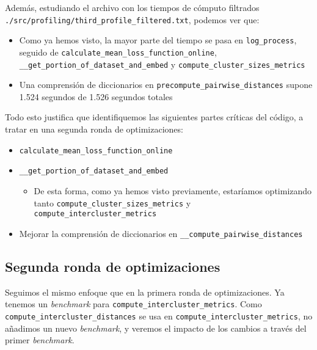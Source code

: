 Además, estudiando el archivo con los tiempos de cómputo filtrados \lstinline{./src/profiling/third_profile_filtered.txt}, podemos ver que:

\begin{itemize}
    \item Como ya hemos visto, la mayor parte del tiempo se pasa en \lstinline{log_process}, seguido de \lstinline{calculate_mean_loss_function_online}, \lstinline{__get_portion_of_dataset_and_embed} y \lstinline{compute_cluster_sizes_metrics}
    \item Una comprensión de diccionarios en \lstinline{precompute_pairwise_distances} supone 1.524 segundos de 1.526 segundos totales
\end{itemize}

Todo esto justifica que identifiquemos las siguientes partes críticas del código, a tratar en una segunda ronda de optimizaciones:

\begin{itemize}
    \item \lstinline{calculate_mean_loss_function_online}
    \item \lstinline{__get_portion_of_dataset_and_embed}
        \begin{itemize}
            \item De esta forma, como ya hemos visto previamente, estaríamos optimizando tanto \lstinline{compute_cluster_sizes_metrics} y \lstinline{compute_intercluster_metrics}
        \end{itemize}
    \item Mejorar la comprensión de diccionarios en \lstinline{__compute_pairwise_distances}
\end{itemize}

\subsection{Segunda ronda de optimizaciones} \label{isubs:segunda_ronda_optimizaciones}

Seguimos el mismo enfoque que en la primera ronda de optimizaciones. Ya tenemos un \textit{benchmark} para \lstinline{compute_intercluster_metrics}. Como \lstinline{compute_intercluster_distances} se usa en \lstinline{compute_intercluster_metrics}, no añadimos un nuevo \textit{benchmark}, y veremos el impacto de los cambios a través del primer \textit{benchmark}.

